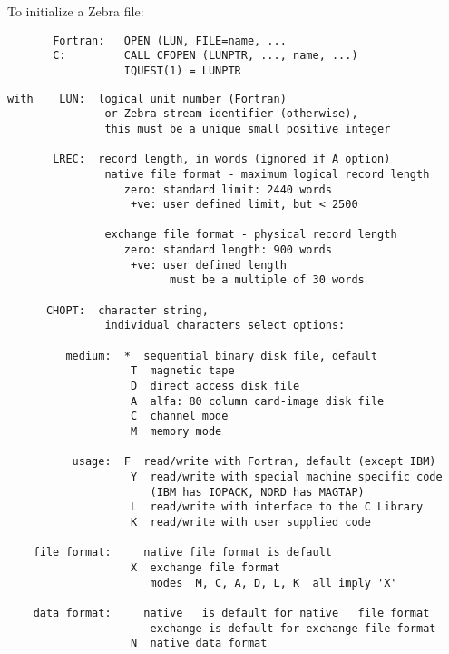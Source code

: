 To initialize a Zebra file:
\begin{verbatim}
       Fortran:   OPEN (LUN, FILE=name, ...
       C:         CALL CFOPEN (LUNPTR, ..., name, ...)
                  IQUEST(1) = LUNPTR
\end{verbatim}
\begin{verbatim}
with    LUN:  logical unit number (Fortran)
               or Zebra stream identifier (otherwise),
               this must be a unique small positive integer

       LREC:  record length, in words (ignored if A option)
               native file format - maximum logical record length
                  zero: standard limit: 2440 words
                   +ve: user defined limit, but < 2500

               exchange file format - physical record length
                  zero: standard length: 900 words
                   +ve: user defined length
                         must be a multiple of 30 words

      CHOPT:  character string,
               individual characters select options:

         medium:  *  sequential binary disk file, default
                   T  magnetic tape
                   D  direct access disk file
                   A  alfa: 80 column card-image disk file
                   C  channel mode
                   M  memory mode

          usage:  F  read/write with Fortran, default (except IBM)
                   Y  read/write with special machine specific code
                      (IBM has IOPACK, NORD has MAGTAP)
                   L  read/write with interface to the C Library
                   K  read/write with user supplied code

    file format:     native file format is default
                   X  exchange file format
                      modes  M, C, A, D, L, K  all imply 'X'

    data format:     native   is default for native   file format
                      exchange is default for exchange file format
                   N  native data format
\end{verbatim}

